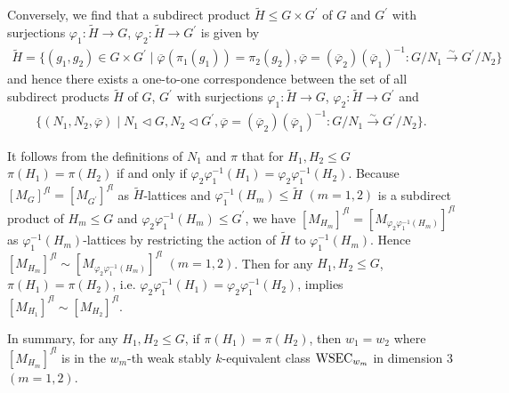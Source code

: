 \documentclass{amsart}
\theoremstyle{plain}
\theoremstyle{definition}
\theoremstyle{remark}
\newcounter{sub}\def\tr{\mbox{tr }}
\begin{document}
{%
Conversely, 
we find that a subdirect product 
$\widetilde{H}\leq G\times G^\prime$ of $G$ and $G^\prime$ 
with surjections $\varphi_1: \widetilde{H}\to G$, $\varphi_2: \widetilde{H}\to G^\prime$ 
is given by 
\begin{align*}
\widetilde{H}=\{(g_1,g_2)\in G\times G^\prime\mid \overline{\varphi}(\pi_1(g_1))=\pi_2(g_2), 
\overline{\varphi}=(\overline{\varphi}_2)(\overline{\varphi}_1)^{-1}:
G/N_1\xrightarrow{\sim}G^\prime/N_2\}
\end{align*}
and hence there exists a one-to-one correspondence 
between the set of all subdirect products $\widetilde{H}$ of $G$, $G^\prime$ 
with surjections $\varphi_1: \widetilde{H}\to G$, $\varphi_2: \widetilde{H}\to G^\prime$ and 
\begin{align*}
\{(N_1,N_2,\overline{\varphi})\mid N_1\lhd G, N_2\lhd G^\prime, 
\overline{\varphi}=(\overline{\varphi}_2)(\overline{\varphi}_1)^{-1}:
G/N_1\xrightarrow{\sim}G^\prime/N_2\}. 
\end{align*}

It follows from the definitions of $N_1$ and $\pi$ that 
for $H_1,H_2\leq G$ 
$\pi(H_1)=\pi(H_2)$ 
if and only if 
$\varphi_2\varphi_1^{-1}(H_1)=\varphi_2\varphi_1^{-1}(H_2)$. 
Because $[M_G]^{fl}=[M_{G^\prime}]^{fl}$ as $\widetilde{H}$-lattices 
and $\varphi_1^{-1}(H_m)\leq \widetilde{H}$ $(m=1,2)$ 
is a subdirect product of 
$H_m\leq G$ and $\varphi_2\varphi_1^{-1}(H_m)\leq G^\prime$, 
we have $[M_{H_m}]^{fl}=[M_{\varphi_2\varphi_1^{-1}(H_m)}]^{fl}$ 
as $\varphi_1^{-1}(H_m)$-lattices by restricting the action of 
$\widetilde{H}$ to $\varphi_1^{-1}(H_m)$. 
Hence $[M_{H_m}]^{fl}\sim [M_{\varphi_2\varphi_1^{-1}(H_m)}]^{fl}$ $(m=1,2)$. 
Then for any $H_1,H_2\leq G$, 
$\pi(H_1)=\pi(H_2)$, i.e. 
$\varphi_2\varphi_1^{-1}(H_1)=\varphi_2\varphi_1^{-1}(H_2)$, 
implies $[M_{H_1}]^{fl}\sim [M_{H_2}]^{fl}$. 

In summary, for any $H_1,H_2\leq G$, if $\pi(H_1)=\pi(H_2)$, then $w_1=w_2$ 
where $[M_{H_m}]^{fl}$ is in the $w_m$-th weak stably $k$-equivalent class 
${\rm WSEC}_{w_m}$ in dimension $3$ $(m=1,2)$. 

}
\end{document}
